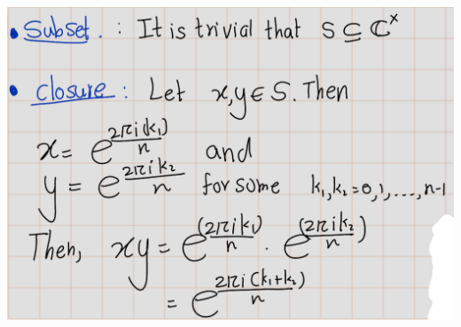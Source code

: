 \documentclass[
]{book}
\theoremstyle{definition}
\theoremstyle{definition}
\theoremstyle{definition}
\theoremstyle{definition}
\theoremstyle{remark}
\begin{document}
\includegraphics{figures/ch_2/fig24.png}
\end{document}
